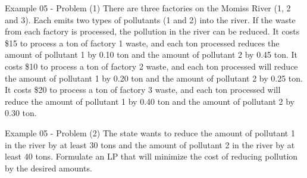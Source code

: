 \begin{frame}{Example 05 - Problem (1)}
There are three factories on the Momiss River (1, 2 and 3). Each emits two types
of pollutants (1 and 2) into the river. If the waste from each factory is
processed, the pollution in the river can be reduced. It costs \$15 to process a
ton of factory 1 waste, and each ton processed reduces the amount of pollutant 1
by 0.10 ton and the amount of pollutant 2 by 0.45 ton. It costs \$10 to process
a ton of factory 2 waste, and each ton processed will reduce the amount of
pollutant 1 by 0.20 ton and the amount of pollutant 2 by 0.25 ton. It costs \$20
to process a ton of factory 3 waste, and each ton processed will reduce the
amount of pollutant 1 by 0.40 ton and the amount of pollutant 2 by 0.30 ton.
\end{frame}

\begin{frame}{Example 05 - Problem (2)}
The state wants to reduce the amount of pollutant 1 in the river by at least 30
tons and the amount of pollutant 2 in the river by at least 40 tons. Formulate
an LP that will minimize the cost of reducing pollution by the desired amounts.
\end{frame}
